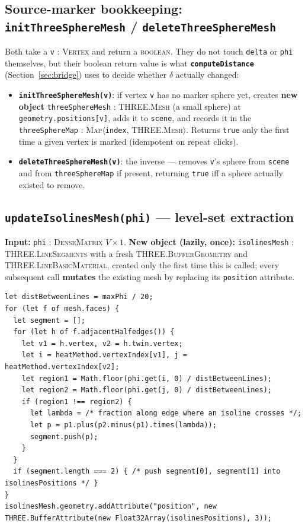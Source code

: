 \documentclass[11pt]{article}
\newcommand{\code}[1]{\texttt{#1}}
\newcommand{\func}[1]{\texttt{\textbf{#1}}}
\newcommand{\type}[1]{\textsc{#1}}
\begin{document}
\subsection{Source-marker bookkeeping: \func{initThreeSphereMesh} / \func{deleteThreeSphereMesh}}
Both take a \code{v} : \type{Vertex} and return a \type{boolean}. They do not touch
\code{delta} or \code{phi} themselves, but their boolean return value is what
\func{computeDistance} (Section~\ref{sec:bridge}) uses to decide whether $\delta$ actually
changed:
\begin{itemize}[leftmargin=1.6em]
\item \func{initThreeSphereMesh(v)}: if vertex \code{v} has no marker sphere yet, creates
  \textbf{new object} \code{threeSphereMesh} : \type{THREE.Mesh} (a small sphere) at
  \code{geometry.positions[v]}, adds it to \code{scene}, and records it in the
  \code{threeSphereMap} : \type{Map}$\langle$\code{index}, \type{THREE.Mesh}$\rangle$.
  Returns \code{true} only the first time a given vertex is marked (idempotent on repeat
  clicks).
\item \func{deleteThreeSphereMesh(v)}: the inverse --- removes \code{v}'s sphere from
  \code{scene} and from \code{threeSphereMap} if present, returning \code{true} iff a
  sphere actually existed to remove.
\end{itemize}

\subsection{\func{updateIsolinesMesh(phi)} --- level-set extraction}
\label{sec:isolines}
\textbf{Input:} \code{phi} : \type{DenseMatrix} $V\times1$. \textbf{New object (lazily,
once):} \code{isolinesMesh} : \type{THREE.LineSegments} with a fresh
\type{THREE.BufferGeometry} and \type{THREE.LineBasicMaterial}, created only the first time
this is called; every subsequent call \textbf{mutates} the existing mesh by replacing its
\code{position} attribute.

\begin{lstlisting}
let distBetweenLines = maxPhi / 20;
for (let f of mesh.faces) {
  let segment = [];
  for (let h of f.adjacentHalfedges()) {
    let v1 = h.vertex, v2 = h.twin.vertex;
    let i = heatMethod.vertexIndex[v1], j = heatMethod.vertexIndex[v2];
    let region1 = Math.floor(phi.get(i, 0) / distBetweenLines);
    let region2 = Math.floor(phi.get(j, 0) / distBetweenLines);
    if (region1 !== region2) {
      let lambda = /* fraction along edge where an isoline crosses */;
      let p = p1.plus(p2.minus(p1).times(lambda));
      segment.push(p);
    }
  }
  if (segment.length === 2) { /* push segment[0], segment[1] into isolinesPositions */ }
}
isolinesMesh.geometry.addAttribute("position", new THREE.BufferAttribute(new Float32Array(isolinesPositions), 3));
\end{lstlisting}
\end{document}
